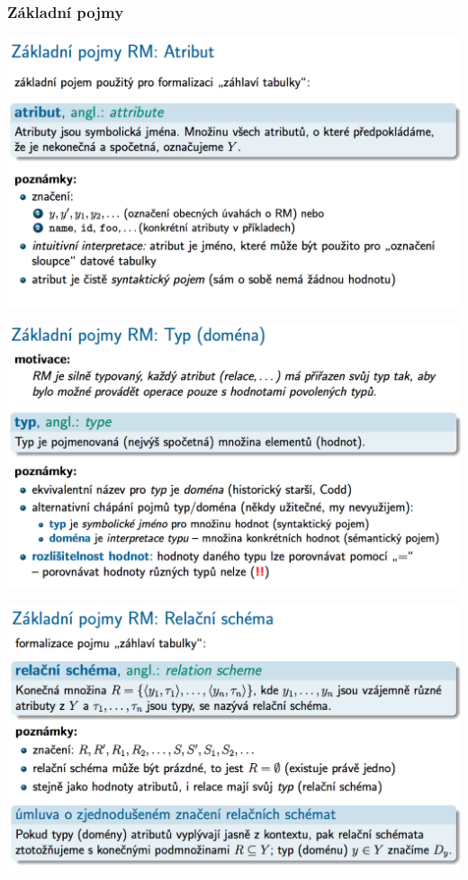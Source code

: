 \documentclass[10pt,a4paper]{article}
\begin{document}
\subsubsection{Základní pojmy}
	\includegraphics[scale=0.4]{img/10}
	
	\includegraphics[scale=0.4]{img/11}
	
	\includegraphics[scale=0.4]{img/12}
	
\end{document}
